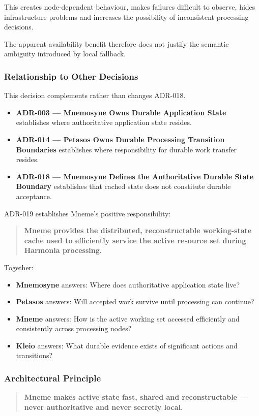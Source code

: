 This creates node-dependent behaviour, makes failures difficult to observe, hides infrastructure problems and increases the possibility of inconsistent processing decisions.

The apparent availability benefit therefore does not justify the semantic ambiguity introduced by local fallback.

\subsubsection{Relationship to Other Decisions}

This decision complements rather than changes ADR-018.

\begin{itemize}
    \item \textbf{ADR-003 --- Mnemosyne Owns Durable Application State} establishes where authoritative application state resides.
    \item \textbf{ADR-014 --- Petasos Owns Durable Processing Transition Boundaries} establishes where responsibility for durable work transfer resides.
    \item \textbf{ADR-018 --- Mnemosyne Defines the Authoritative Durable State Boundary} establishes that cached state does not constitute durable acceptance.
\end{itemize}

ADR-019 establishes Mneme's positive responsibility:

\begin{quote}
    \textbf{Mneme provides the distributed, reconstructable working-state cache used to efficiently service the active resource set during Harmonia processing.}
\end{quote}

Together:
\begin{itemize}
    \item \textbf{Mnemosyne} answers: Where does authoritative application state live?
    \item \textbf{Petasos} answers: Will accepted work survive until processing can continue?
    \item \textbf{Mneme} answers: How is the active working set accessed efficiently and consistently across processing nodes?
    \item \textbf{Kleio} answers: What durable evidence exists of significant actions and transitions?
\end{itemize}

\subsubsection{Architectural Principle}

\begin{quote}
    \textbf{Mneme makes active state fast, shared and reconstructable --- never authoritative and never secretly local.}
\end{quote}

